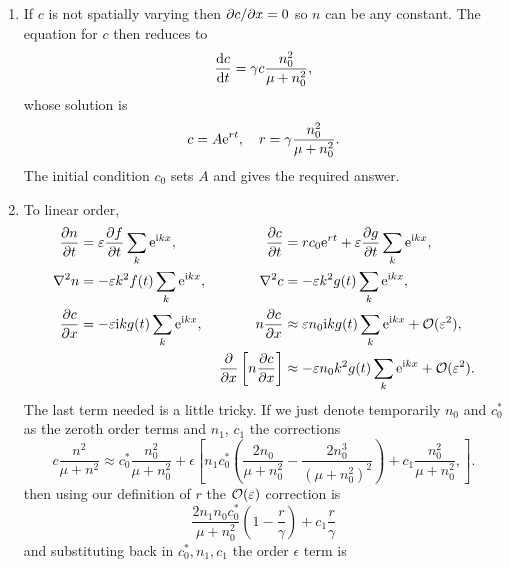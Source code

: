 \documentclass[a4paper, 12pt]{article}
\begin{document}
\begin{enumerate}[label={\bf \arabic{*}.\;}, ref={\arabic{*}},itemsep=3ex, left=0ex]
{\begin{enumerate}[label=(\alph*)]
      \end{enumerate}
    }
    {
      \begin{enumerate}[label=(\alph*)]
        \item{If $c$ is not spatially varying then $\pd{c}{x}=0$ so $n$ can be any constant. The equation for $c$ then reduces to
            \begin{equation}
              \fd{c}{t} = \gamma c \frac{n_0^2}{\mu+n_0^2},
            \end{equation}
            whose solution is
            \begin{equation}
              c= A\mathrm{e}^{rt},\quad r = \gamma\frac{n_0^2}{\mu+n_0^2}.
            \end{equation}
            The initial condition $c_0$ sets $A$ and gives the required answer.
          }
        \item{
            To linear order,
            \begin{align}
              \pd{n}{t} &= \epsilon\pd{f}{t}\sum_{k}\e^{\i kx}, & \pd{c}{t} &= rc_0\e^{rt}+ \epsilon\pd{g}{t}\sum_{k}\e^{\i kx},\nonumber\\
              \nabla^2 n &= -\epsilon k^2 f(t)\sum_{k}\e^{\i kx},& \nabla^2 c &= -\epsilon k^2 g(t)\sum_{k}\e^{\i kx},\nonumber\\
              \pd{c}{x} &= -\epsilon\i k g(t)\sum_{k}\e^{\i kx}, & n\pd{c}{x} &\approx \epsilon n_0\i k g(t)\sum_{k}\e^{\i kx} + \order(\epsilon^2),\nonumber\\
              &&\pd{}{x}\left[n\pd{c}{x}\right] &\approx -\epsilon n_0 k^2 g(t)\sum_{k}\e^{\i kx} + \order(\epsilon^2).
            \end{align}
            The last term needed is a little tricky. If we just denote temporarily $n_0$ and $c_0^*$ as the zeroth order terms and $n_1$, $c_1$ the corrections
            \begin{equation}
              c\frac{n^2}{\mu + n^2} \approx c_0^*\frac{n_0^2}{\mu + n_0^2} + \epsilon\left[n_1c_0^*\left(\frac{2n_0}{\mu + n_0^2} - \frac{2n_0^3}{(\mu+n_0^2)^2}\right) + c_1\frac{n_0^2}{\mu+n_0^2},
              \right].
            \end{equation}
            then using our definition of $r$ the $\mathcal{O}(\varepsilon)$ correction is
            \begin{equation}
              \frac{2n_1n_0 c_0^*}{\mu + n_0^2}\left(1 - \frac{r}{\gamma}\right) + c_1\frac{r}{\gamma}
            \end{equation}
            and substituting back in $c_0^*,n_1,c_1$ the order $\epsilon$ term is
}
\end{enumerate}}
\end{enumerate}
\end{document}
